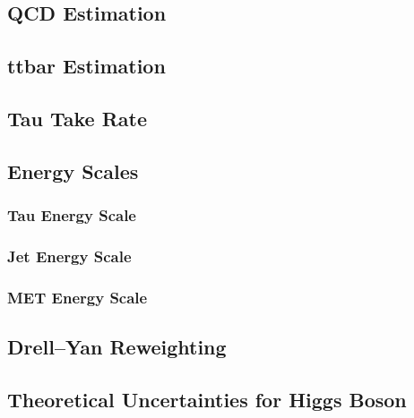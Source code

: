 \subsection{QCD Estimation}
\subsection{ttbar Estimation}
\subsection{Tau Take Rate}
\subsection{Energy Scales}
\subsubsection{Tau Energy Scale}
\subsubsection{Jet Energy Scale}
\subsubsection{MET Energy Scale}
\subsection{Drell--Yan Reweighting}
\subsection{Theoretical Uncertainties for Higgs Boson}



